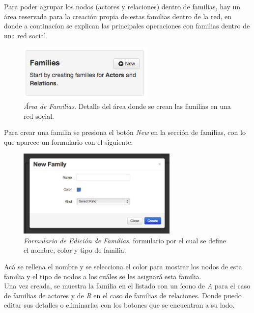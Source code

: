 Para poder agrupar los nodos (actores y relaciones) dentro de familias, hay un área reservada para la creación propia de estas familias dentro de la red, en donde a continacíon se explican las principales operaciones con familias dentro de una red social.\\

\begin{figure}[H]
  \centering
  \includegraphics[width=0.6\textwidth]{images/area_familias.png}
  \caption[Área de Familias]{\emph{Área de Familias}. Detalle del área donde se crean las familias en una red social.}
  \label{area_familias}
\end{figure}

Para crear una familia se presiona el botón \emph{New} en la sección de familias, con lo que aparece un formulario con el siguiente:

\begin{figure}[H]
  \centering
  \includegraphics[width=0.7\textwidth]{images/edicion_familias.png}
  \caption[Formulario de Edición de Familias]{\emph{Formulario de Edición de Familias}. formulario por el cual se define el nombre, color y tipo de familia.}
  \label{edicion_familias}
\end{figure}

Acá se rellena el nombre y se selecciona el color para mostrar los nodos de esta familia y el tipo de nodos a los cuáles se les asignará esta familia.\\

Una vez creada, se muestra la familia en el listado con un ícono de \emph{A} para el caso de familias de actores y de \emph{R} en el caso de familias de relaciones. Donde puedo editar sus detalles o eliminarlas con los botones que se encuentran a su lado.

